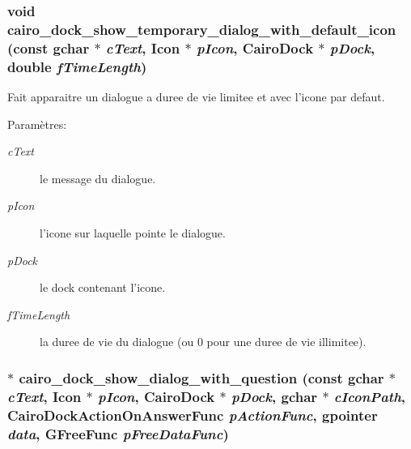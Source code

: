 \subsubsection{\setlength{\rightskip}{0pt plus 5cm}void cairo\_\-dock\_\-show\_\-temporary\_\-dialog\_\-with\_\-default\_\-icon (const gchar $\ast$ {\em c\-Text}, {\bf Icon} $\ast$ {\em p\-Icon}, {\bf Cairo\-Dock} $\ast$ {\em p\-Dock}, double {\em f\-Time\-Length})}\label{cairo-dock-dialogs_8c_134e3e847b1807f9d436c7472da8e8bc}


Fait apparaitre un dialogue a duree de vie limitee et avec l'icone par defaut. \begin{Desc}
\item[Param\`{e}tres:]
\begin{description}
\item[{\em c\-Text}]le message du dialogue. \item[{\em p\-Icon}]l'icone sur laquelle pointe le dialogue. \item[{\em p\-Dock}]le dock contenant l'icone. \item[{\em f\-Time\-Length}]la duree de vie du dialogue (ou 0 pour une duree de vie illimitee). \end{description}
\end{Desc}
\subsubsection{$\ast$ cairo\_\-dock\_\-show\_\-dialog\_\-with\_\-question (const gchar $\ast$ {\em c\-Text}, {\bf Icon} $\ast$ {\em p\-Icon}, {\bf Cairo\-Dock} $\ast$ {\em p\-Dock}, gchar $\ast$ {\em c\-Icon\-Path}, {\bf Cairo\-Dock\-Action\-On\-Answer\-Func} {\em p\-Action\-Func}, gpointer {\em data}, GFree\-Func {\em p\-Free\-Data\-Func})}\label{cairo-dock-dialogs_8c_3adbd6e83f88071367e270b2c01cc1cc}


